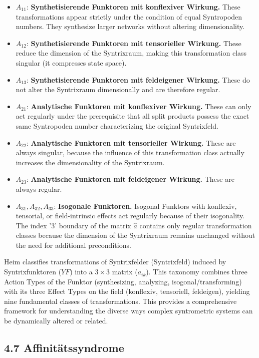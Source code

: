 \documentclass[12pt]{article}
\newcommand{\syntrixfeld}{\text{Syntrixfeld}}
\newcommand{\syntrixfunktor}{YF}
\begin{document}
\begin{itemize}
    \item \( A_{11} \): \textbf{Synthetisierende Funktoren mit konflexiver Wirkung.} These transformations appear strictly under the condition of equal Syntropoden numbers. They synthesize larger networks without altering dimensionality.
    \item \( A_{12} \): \textbf{Synthetisierende Funktoren mit tensorieller Wirkung.} These reduce the dimension of the Syntrixraum, making this transformation class singular (it compresses state space).
    \item \( A_{13} \): \textbf{Synthetisierende Funktoren mit feldeigener Wirkung.} These do not alter the Syntrixraum dimensionally and are therefore regular.
    \item \( A_{21} \): \textbf{Analytische Funktoren mit konflexiver Wirkung.} These can only act regularly under the prerequisite that all split products possess the exact same Syntropoden number characterizing the original Syntrixfeld.
    \item \( A_{22} \): \textbf{Analytische Funktoren mit tensorieller Wirkung.} These are always singular, because the influence of this transformation class actually increases the dimensionality of the Syntrixraum.
    \item \( A_{23} \): \textbf{Analytische Funktoren mit feldeigener Wirkung.} These are always regular.
    \item \( A_{31}, A_{32}, A_{33} \): \textbf{Isogonale Funktoren.} Isogonal Funktors with konflexiv, tensorial, or field-intrinsic effects act regularly because of their isogonality. The index '3' boundary of the matrix \( \hat{a} \) contains only regular transformation classes because the dimension of the Syntrixraum remains unchanged without the need for additional preconditions.
\end{itemize}

Heim classifies transformations of Syntrixfelder (\(\syntrixfeld\)) induced by Syntrixfunktoren (\(\syntrixfunktor\)) into a \(3 \times 3\) matrix (\(a_{ik}\)). This taxonomy combines three Action Types of the Funktor (synthesizing, analyzing, isogonal/transforming) with its three Effect Types on the field (konflexiv, tensoriell, feldeigen), yielding nine fundamental classes of transformations. This provides a comprehensive framework for understanding the diverse ways complex syntrometric systems can be dynamically altered or related.

\subsection{4.7 Affinitätssyndrome}
\label{sec:affinitaetssyndrome}
\end{document}
